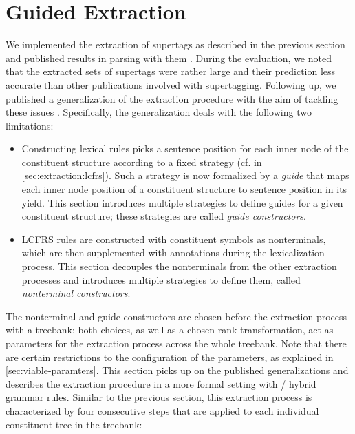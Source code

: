 \documentclass[../../document.tex]{subfiles}
\begin{document}
    \section{Guided Extraction} \label{sec:extraction:guided}
    We implemented the extraction of  supertags as described in the previous section and published results in parsing with them \citep{RupMoe21}.
    During the evaluation, we noted that the extracted sets of supertags were rather large and their prediction less accurate than other publications involved with supertagging.
    Following up, we published a generalization of the extraction procedure with the aim of tackling these issues \citep{Rup22}.
    Specifically, the generalization deals with the following two limitations:
    \begin{itemize}
        \item
            Constructing lexical  rules picks a sentence position for each inner node of the constituent structure according to a fixed strategy (cf.\@ {} in \cref{sec:extraction:lcfrs}).
            Such a strategy is now formalized by a \emph{guide} that maps each inner node position of a constituent structure to sentence position in its yield.
            This section introduces multiple strategies to define guides for a given constituent structure; these strategies are called \emph{guide constructors}.
        \item
            LCFRS rules are constructed with constituent symbols as nonterminals, which are then supplemented with annotations during the lexicalization process.
            This section decouples the nonterminals from the other extraction processes and introduces multiple strategies to define them, called \emph{nonterminal constructors}.
    \end{itemize}
    The nonterminal and guide constructors are chosen before the extraction process with a treebank; both choices, as well as a chosen rank transformation, act as parameters for the extraction process across the whole treebank.
    Note that there are certain restrictions to the configuration of the parameters, as explained in \cref{sec:viable-paramters}.
    This section picks up on the published generalizations and describes the extraction procedure in a more formal setting with / hybrid grammar rules.
    Similar to the previous section, this extraction process is characterized by four consecutive steps that are applied to each individual constituent tree in the treebank:
\end{document}
